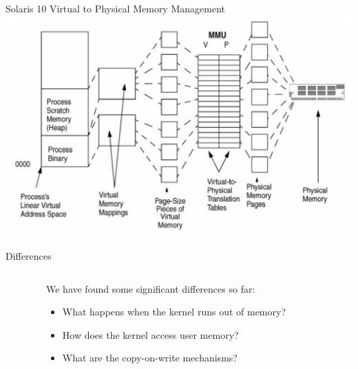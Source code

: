\documentclass[aspectratio=169]{beamer}
\newcommand{\bi}{\begin{itemize}}
\newcommand{\ei}{\end{itemize}}
\begin{document}
\begin{frame}{Solaris 10 Virtual to Physical Memory Management}
\includegraphics[scale=0.20]{./figures/openindiana_mmu.jpg}
\end{frame}


\begin{frame}{Differences}
  \begin{columns}[T]
    \begin{column}{0.2\textwidth}
    \end{column}
    \begin{column}{0.6\textwidth}
      We have found some significant differences so far:
      \bi
      \pause
    \item What happens when the kernel runs out of memory?
      \pause
    \item How does the kernel access user memory?
      \pause
    \item What are the copy-on-write mechanisms?
      \ei
    \end{column}
    \begin{column}{0.2\textwidth}
    \end{column}
  \end{columns}
\end{frame}
\end{document}
